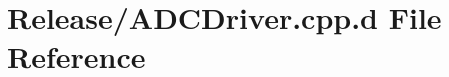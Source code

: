 \hypertarget{_release_2_a_d_c_driver_8cpp_8d}{\section{\-Release/\-A\-D\-C\-Driver.cpp.\-d \-File \-Reference}
\label{_release_2_a_d_c_driver_8cpp_8d}
}
